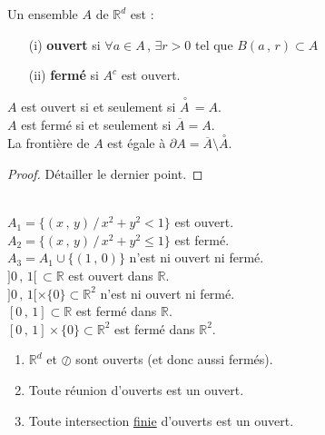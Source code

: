\documentclass[class=report,crop=false]{standalone}
\begin{document}
\begin{definition}
Un ensemble $A$ de $\mathbb{R}^d$ est :
\begin{enumerate}
\item[(i)] {\bf ouvert} si $\forall a \in A \,,\, \exists r > 0$ tel que $B(a\,,\,r) \subset A$
\item[(ii)] {\bf fermé} si $A^c$ est ouvert.
\end{enumerate}
\end{definition}

\begin{proposition}
$A$ est ouvert si et seulement si $\stackrel{\,\circ}{A} \,= A$.\\
$A$ est fermé si et seulement si $\overline{A}= A$.\\
La fronti\`ere de $A$ est égale \`a $\partial A=\overline A \setminus \stackrel{\,\circ}{A} $.
\end{proposition}

\begin{proof} Détailler le dernier point.
\end{proof}

\\
$A_{1} = \lbrace (x\,,\,y) \,/\, x^2 + y^2 < 1 \rbrace$ est ouvert.\\
$A_{2} = \lbrace (x\,,\,y) \,/ \, x^2 + y^2 \leqslant 1 \rbrace$ est fermé.\\
$A_{3} = A_{1} \cup \lbrace (1\,,\,0) \rbrace$ n'est ni ouvert ni fermé.\\
$]0\,,\,1[ \,\subset \mathbb{R}$ est ouvert dans $\mathbb{R}$.\\
$]0\,,\,1[ \times \lbrace 0 \rbrace \subset \mathbb{R}^2$ n'est ni ouvert ni fermé.\\
$[0\,,\,1] \subset \mathbb{R}$ est fermé dans $\mathbb{R}$.\\
$[0\,,\,1] \times \lbrace 0 \rbrace \subset \mathbb{R}^2$ est fermé dans $\mathbb{R}^2$.



\begin{proposition}
\begin{enumerate}
\item $\mathbb{R}^d$ et $\oslash$ sont ouverts (et donc aussi fermés).
\item Toute réunion d'ouverts est un ouvert.
\item Toute intersection \underline{finie} d'ouverts est un ouvert.
\end{enumerate}
\end{proposition}
\end{document}
